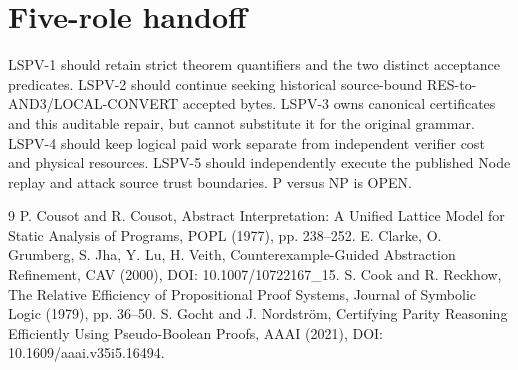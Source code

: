 \documentclass[10pt]{article}
\begin{document}
\section*{Five-role handoff}
LSPV-1 should retain strict theorem quantifiers and the two distinct acceptance predicates. LSPV-2 should continue seeking historical source-bound RES-to-AND3/LOCAL-CONVERT accepted bytes. LSPV-3 owns canonical certificates and this auditable repair, but cannot substitute it for the original grammar. LSPV-4 should keep logical paid work separate from independent verifier cost and physical resources. LSPV-5 should independently execute the published Node replay and attack source trust boundaries. P versus NP is OPEN.

\begin{thebibliography}{9}
 P. Cousot and R. Cousot, Abstract Interpretation: A Unified Lattice Model for Static Analysis of Programs, POPL (1977), pp. 238--252.
 E. Clarke, O. Grumberg, S. Jha, Y. Lu, H. Veith, Counterexample-Guided Abstraction Refinement, CAV (2000), DOI: 10.1007/10722167\_15.
 S. Cook and R. Reckhow, The Relative Efficiency of Propositional Proof Systems, Journal of Symbolic Logic (1979), pp. 36--50.
 S. Gocht and J. Nordstr{\"o}m, Certifying Parity Reasoning Efficiently Using Pseudo-Boolean Proofs, AAAI (2021), DOI: 10.1609/aaai.v35i5.16494.
\end{thebibliography}
\end{document}
